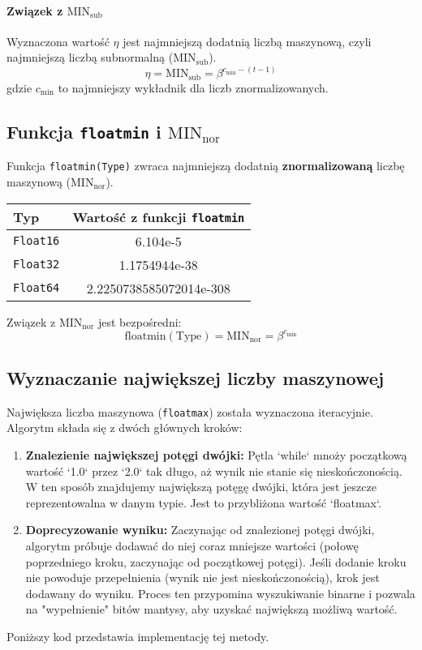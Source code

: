 \documentclass[a4paper,12pt]{article}
\begin{document}
\paragraph{Związek z $\mathrm{MIN_{sub}}$}
Wyznaczona wartość $\eta$ jest najmniejszą dodatnią liczbą maszynową, czyli najmniejszą liczbą subnormalną ($\mathrm{MIN_{sub}}$).
\[
\eta = \mathrm{MIN_{sub}} = \beta^{c_{\min} - (t-1)}
\]
gdzie $c_{\min}$ to najmniejszy wykładnik dla liczb znormalizowanych.

\subsection{ Funkcja \texttt{floatmin} i $\mathrm{MIN_{nor}}$}

Funkcja \texttt{floatmin(Type)} zwraca najmniejszą dodatnią \textbf{znormalizowaną} liczbę maszynową ($\mathrm{MIN_{nor}}$).

\begin{center}
\begin{tabular}{@{}l c@{}}
\hline
Typ & Wartość z funkcji \texttt{floatmin} \\
\hline
\texttt{Float16} & 6.104e-5 \\
\texttt{Float32} & 1.1754944e-38 \\
\texttt{Float64} & 2.2250738585072014e-308 \\
\hline
\end{tabular}
\end{center}

Związek z $\mathrm{MIN_{nor}}$ jest bezpośredni:
\[
\mathrm{floatmin(Type)} = \mathrm{MIN_{nor}} = \beta^{c_{\min}}
\]

\subsection{ Wyznaczanie największej liczby maszynowej}

Największa liczba maszynowa (\texttt{floatmax}) została wyznaczona iteracyjnie. Algorytm składa się z dwóch głównych kroków:
\begin{enumerate}
    \item \textbf{Znalezienie największej potęgi dwójki:} Pętla `while` mnoży początkową wartość `1.0` przez `2.0` tak długo, aż wynik nie stanie się nieskończonością. W ten sposób znajdujemy największą potęgę dwójki, która jest jeszcze reprezentowalna w danym typie. Jest to przybliżona wartość `floatmax`.
    \item \textbf{Doprecyzowanie wyniku:} Zaczynając od znalezionej potęgi dwójki, algorytm próbuje dodawać do niej coraz mniejsze wartości (połowę poprzedniego kroku, zaczynając od początkowej potęgi). Jeśli dodanie kroku nie powoduje przepełnienia (wynik nie jest nieskończonością), krok jest dodawany do wyniku. Proces ten przypomina wyszukiwanie binarne i pozwala na "wypełnienie" bitów mantysy, aby uzyskać największą możliwą wartość.
\end{enumerate}
Poniższy kod przedstawia implementację tej metody.
\end{document}
